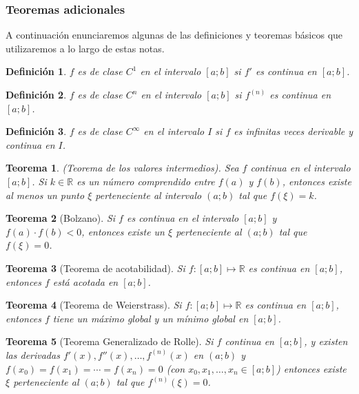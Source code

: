 \documentclass[12pt]{article}
\newtheorem{Def}{Definici\'on}
\newtheorem{Teo}{Teorema}
\begin{document}
\subsubsection{Teoremas adicionales}

A continuación enunciaremos algunas de las definiciones y teoremas básicos que utilizaremos a lo largo de estas notas.

\begin{Def}$f$ es de clase $C^1$ en el intervalo $[a;b]$ si $f'$ es continua en $[a;b]$.
\end{Def}

\begin{Def}$f$ es de clase $C^n$ en el intervalo $[a;b]$ si $f^{(n)}$ es continua en $[a;b]$.
\end{Def}

\begin{Def}$f$ es de clase $C^\infty$ en el intervalo $I$ si $f$ es infinitas veces derivable y continua en $I$.
\end{Def}

\begin{Teo} (Teorema de los valores intermedios). Sea $f$ continua en el intervalo $[a;b]$. Si $k \in \mathbb{R}$ es un número comprendido entre $f(a)$ y $f(b)$, entonces existe al menos un punto $\xi$ perteneciente al intervalo $(a;b)$ tal que $f(\xi) = k$.
\end{Teo}

\begin{Teo}[Bolzano]Si $f$ es continua en el intervalo $[a;b]$ y $f(a) \cdot f(b) < 0$, entonces existe un $\xi$ perteneciente al $(a;b)$ tal que $f(\xi) = 0$.
\end{Teo}

\begin{Teo}[Teorema de acotabilidad] Si $f : [a;b] \mapsto \mathbb{R}$ es continua en $[a;b]$, entonces $f$ está acotada en $[a;b]$.
\end{Teo}

\begin{Teo}[Teorema de Weierstrass] Si $f : [a;b] \mapsto \mathbb{R}$ es continua en $[a;b]$, entonces $f$ tiene un máximo global y un mínimo global en $[a;b]$.
\end{Teo}

\begin{Teo}[Teorema Generalizado de Rolle] Si $f$ continua en $[a;b]$, y existen las derivadas $f'(x), f''(x), \ldots, f^{(n)}(x)$ en $(a;b)$ y $f(x_0) = f(x_1) = \cdots = f(x_n) = 0$ (con $x_0, x_1, \ldots, x_n \in [a;b]$) entonces existe $\xi$ perteneciente al $(a;b)$ tal que $f^{(n)}(\xi) = 0$.
\end{Teo}
\end{document}
